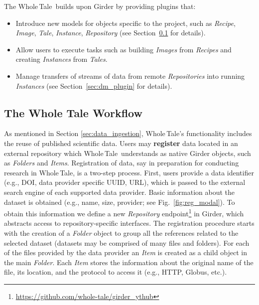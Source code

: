\documentclass{elsarticle}
\newcommand{\wt}{Whole\,Tale}
\begin{document}
The \wt\ builds upon Girder by providing plugins that:
\begin{itemize}
  \item Introduce new models for objects specific to the
    project, such as \emph{Recipe}, \emph{Image}, \emph{Tale}, \emph{Instance},
    \emph{Repository} (see Section~\ref{sec:wt_plugin} for details).
  \item Allow users to execute tasks such as building \emph{Images} from
    \emph{Recipes} and creating \emph{Instances} from \emph{Tales}.
  \item Manage transfers of streams of data from remote \emph{Repositories} into
    running \emph{Instances} (see Section~\ref{sec:dm_plugin} for details).
\end{itemize}

\subsection{The Whole Tale Workflow}
\label{sec:wt_plugin}
As mentioned in Section \ref{sec:data_ingestion}, \wt's functionality includes the reuse of published scientific data. Users may {\bf register} data located
in an external repository which \wt\ understands as native Girder objects, such as \emph{Folders} and
\emph{Items}. Registration of data, say in preparation for conducting research in \wt, is a two-step process. First, users provide a data
identifier (e.g., DOI, data provider specific UUID, URL), which is passed to the external search
engine of each supported data provider. Basic information about the dataset is obtained (e.g., name, size, provider; see
Fig.~\ref{fig:reg_modal}). To obtain this information we define a new
\emph{Repository} endpoint\footnote{\url{https://github.com/whole-tale/girder_ythub}} in Girder, which abstracts access to repository-specific interfaces.
The registration procedure starts with the creation of a
\emph{Folder} object to group all the references related to the
selected dataset (datasets may be comprised of many files and folders). 
For each of the files provided by the data provider an \emph{Item} is
created as a child object in the main \emph{Folder}. Each \emph{Item} stores the
information about the original name of the file, its location, and the protocol to
access it (e.g., HTTP, Globus, etc.).
\end{document}
